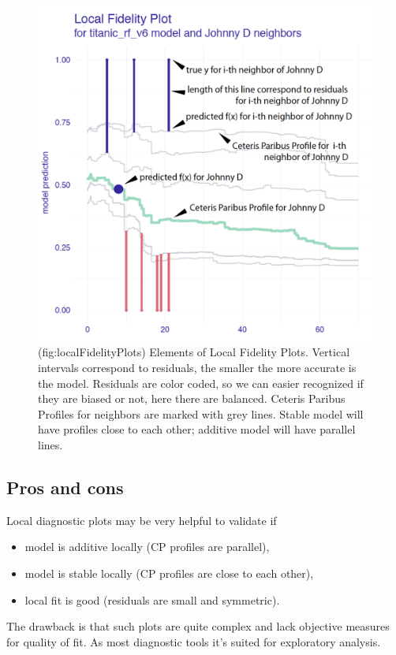 \documentclass[12pt,]{krantz}
\providecommand{\tightlist}{%
  \setlength{\itemsep}{0pt}\setlength{\parskip}{0pt}}
\theoremstyle{definition}
\theoremstyle{definition}
\theoremstyle{definition}
\theoremstyle{remark}
\begin{document}
\begin{figure}

{\centering \includegraphics[width=0.7\linewidth]{figure/localFidelityPlots} 

}

\caption{(fig:localFidelityPlots) Elements of Local Fidelity Plots. Vertical intervals correspond to residuals, the smaller the more accurate is the model. Residuals are color coded, so we can easier recognized if they are biased or not, here there are balanced. Ceteris Paribus Profiles for neighbors are marked with grey lines. Stable model will have profiles close to each other; additive model will have parallel lines.}\label{fig:localFidelityPlots}
\end{figure}

\hypertarget{pros-and-cons-3}{%
\subsection{Pros and cons}\label{pros-and-cons-3}}

Local diagnostic plots may be very helpful to validate if

\begin{itemize}
\tightlist
\item
  model is additive locally (CP profiles are parallel),
\item
  model is stable locally (CP profiles are close to each other),
\item
  local fit is good (residuals are small and symmetric).
\end{itemize}

The drawback is that such plots are quite complex and lack objective
measures for quality of fit. As most diagnostic tools it's suited for
exploratory analysis.
\end{document}
